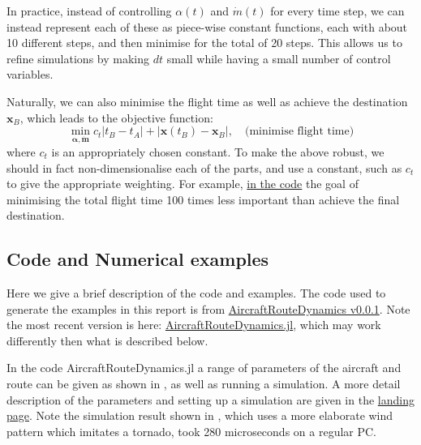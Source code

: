 \documentclass{article}
\renewcommand{\vec}[1]{\boldsymbol{#1}}
\begin{document}
In practice, instead of controlling $\alpha(t)$ and $\dot m(t)$ for every time step, we can instead represent each of these as piece-wise constant functions, each with about 10 different steps, and then minimise for the total of 20 steps. This allows us to refine simulations by making $dt$ small while having a small number of control variables.

Naturally, we can also minimise the flight time as well as achieve the destination $\vec x_B$, which leads to the objective function:
\[
\min_{\vec \alpha, \dot{\vec m}} c_t | t_B - t_A| + | \vec x(t_B) - \vec x_B|, \quad \text{(minimise flight time)}
\]
where $c_t$ is an appropriately chosen constant. To make the above robust, we should in fact non-dimensionalise each of the parts, and use a constant, such as $c_t$ to give the appropriate weighting. For example, \href{https://github.com/arturgower/AircraftRouteDynamics.jl/blob/354db5b80cef8d20cd8fcf031ec3f446823477eb/src/equations-motion.jl#L168}{in the code} the goal of minimising the total flight time 100 times less important than achieve the final destination.

\subsection{Code and Numerical examples}
Here we give a brief description of the code \cite{gower2025AircraftRouteDynamics} and examples. The code used to generate the examples in this report is from \href{https://github.com/arturgower/AircraftRouteDynamics.jl/tree/v0.0.1}{AircraftRouteDynamics v0.0.1}. Note the most recent version is here: \href{https://github.com/arturgower/AircraftRouteDynamics.jl/tree/main}{AircraftRouteDynamics.jl}, which may work differently then what is described below.

In the code AircraftRouteDynamics.jl a range of parameters of the aircraft and route can be given as shown in , as well as running a simulation. A more detail description of the parameters and setting up a simulation are given in the \href{https://github.com/arturgower/AircraftRouteDynamics.jl/blob/v0.0.1/README.md}{landing page}. Note the simulation result shown in , which uses a more elaborate wind pattern which imitates a tornado, took 280 microseconds on a regular PC.
\end{document}
